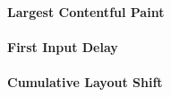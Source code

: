  







\paragraph{Largest Contentful Paint}















 





\paragraph{First Input Delay}










\paragraph{Cumulative Layout Shift}

